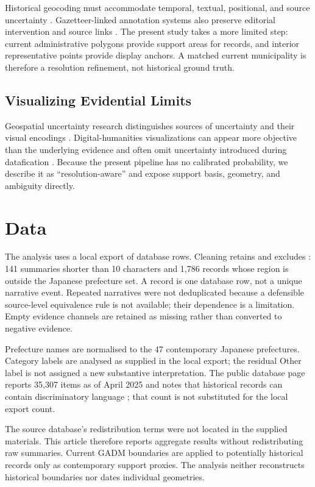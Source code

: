 \documentclass[9pt,twocolumn,a4paper]{extarticle}
\begin{document}
Historical geocoding must accommodate temporal, textual, positional, and source uncertainty \citep{cura2018}. Gazetteer-linked annotation systems also preserve editorial intervention and source links \citep{simon2017}. The present study takes a more limited step: current administrative polygons provide support areas for records, and interior representative points provide display anchors. A matched current municipality is therefore a resolution refinement, not historical ground truth.

\subsection{Visualizing Evidential Limits}

Geospatial uncertainty research distinguishes sources of uncertainty and their visual encodings \citep{maceachren2005}. Digital-humanities visualizations can appear more objective than the underlying evidence and often omit uncertainty introduced during datafication \citep{panagiotidou2023}. Because the present pipeline has no calibrated probability, we describe it as ``resolution-aware'' and expose support basis, geometry, and ambiguity directly.

\section{Data}

The analysis uses a local export of \RawArchiveRecords{} database rows. Cleaning retains \ArchiveRecords{} and excludes \ExcludedArchiveRecords{}: 141 summaries shorter than 10 characters and 1,786 records whose region is outside the Japanese prefecture set. A record is one database row, not a unique narrative event. Repeated narratives were not deduplicated because a defensible source-level equivalence rule is not available; their dependence is a limitation. Empty evidence channels are retained as missing rather than converted to negative evidence.

Prefecture names are normalised to the 47 contemporary Japanese prefectures. Category labels are analysed as supplied in the local export; the residual Other label is not assigned a new substantive interpretation. The public database page reports 35,307 items as of April 2025 and notes that historical records can contain discriminatory language \citep{nichibun2025}; that count is not substituted for the local export count.

The source database's redistribution terms were not located in the supplied materials. This article therefore reports aggregate results without redistributing raw summaries. Current GADM boundaries are applied to potentially historical records only as contemporary support proxies. The analysis neither reconstructs historical boundaries nor dates individual geometries.
\end{document}
